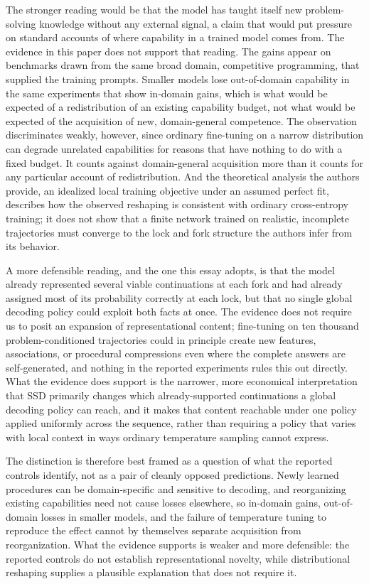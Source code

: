 \documentclass[11pt]{article}
\begin{document}
The stronger reading would be that the model has taught itself new problem-solving knowledge without any external signal, a claim that would put pressure on standard accounts of where capability in a trained model comes from. The evidence in this paper does not support that reading. The gains appear on benchmarks drawn from the same broad domain, competitive programming, that supplied the training prompts. Smaller models lose out-of-domain capability in the same experiments that show in-domain gains, which is what would be expected of a redistribution of an existing capability budget, not what would be expected of the acquisition of new, domain-general competence. The observation discriminates weakly, however, since ordinary fine-tuning on a narrow distribution can degrade unrelated capabilities for reasons that have nothing to do with a fixed budget. It counts against domain-general acquisition more than it counts for any particular account of redistribution. And the theoretical analysis the authors provide, an idealized local training objective under an assumed perfect fit, describes how the observed reshaping is consistent with ordinary cross-entropy training; it does not show that a finite network trained on realistic, incomplete trajectories must converge to the lock and fork structure the authors infer from its behavior.

A more defensible reading, and the one this essay adopts, is that the model already represented several viable continuations at each fork and had already assigned most of its probability correctly at each lock, but that no single global decoding policy could exploit both facts at once. The evidence does not require us to posit an expansion of representational content; fine-tuning on ten thousand problem-conditioned trajectories could in principle create new features, associations, or procedural compressions even where the complete answers are self-generated, and nothing in the reported experiments rules this out directly. What the evidence does support is the narrower, more economical interpretation that SSD primarily changes which already-supported continuations a global decoding policy can reach, and it makes that content reachable under one policy applied uniformly across the sequence, rather than requiring a policy that varies with local context in ways ordinary temperature sampling cannot express.

The distinction is therefore best framed as a question of what the reported controls identify, not as a pair of cleanly opposed predictions. Newly learned procedures can be domain-specific and sensitive to decoding, and reorganizing existing capabilities need not cause losses elsewhere, so in-domain gains, out-of-domain losses in smaller models, and the failure of temperature tuning to reproduce the effect cannot by themselves separate acquisition from reorganization. What the evidence supports is weaker and more defensible: the reported controls do not establish representational novelty, while distributional reshaping supplies a plausible explanation that does not require it.
\end{document}
